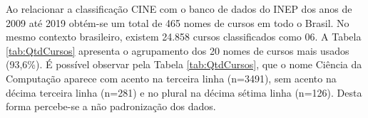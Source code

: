 Ao relacionar a classificação CINE com o banco de dados do INEP dos anos de 2009 até 2019 obtém-se um total de 465 nomes de cursos em todo o Brasil. No mesmo contexto brasileiro, existem 24.858 cursos classificados como 06. A Tabela \ref{tab:QtdCursos} apresenta o agrupamento dos 20 nomes de cursos mais usados (93,6\%). É possível observar pela Tabela \ref{tab:QtdCursos}, que o nome Ciência da Computação aparece com acento na terceira linha (n=3491), sem acento na décima terceira linha (n=281) e no plural na décima sétima linha (n=126). Desta forma percebe-se a não padronização dos dados.


\begin{table}[H]
\centering
\caption{Quantidade por Nome de Curso de 2009 a 2019}
\label{tab:QtdCursos}
\end{table}
